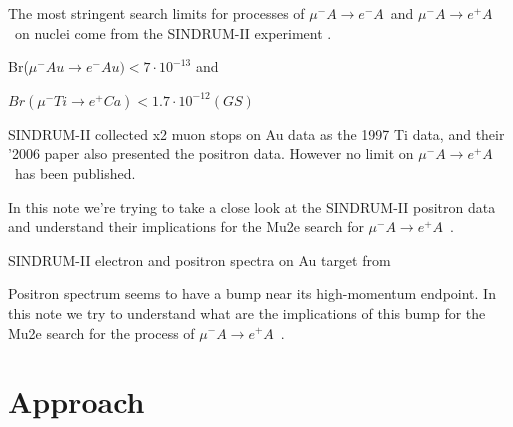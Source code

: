\documentclass[12pt]{article}
\newcommand {\mumemconv} {\mbox{$\mu^- A \rightarrow e^- A$}}
\newcommand {\mumepconv} {\mbox{$\mu^- A \rightarrow e^+ A$}}
\begin{document}
The most stringent search limits for processes of \mumemconv\ and \mumepconv\
on nuclei come from the SINDRUM-II experiment \cite{sindrum_ii_Bertl2006}.

Br($\mu^- Au \rightarrow e^- Au) < 7·10^{-13}$ and

$Br(\mu^- Ti \rightarrow e^+ Ca) < 1.7·10^{-12}(GS)$

SINDRUM-II collected x2 muon stops on Au data as the 1997 Ti data,
and their '2006 paper also presented the positron data.
However no limit on \mumepconv\ has been published.

In this note we're trying to take a close look at the SINDRUM-II positron data
and understand their implications for the Mu2e search for \mumepconv\ .

\vspace{0.2in}
 {
  \label{fig:sindrum_ii_2006_fig_11}
  SINDRUM-II electron and positron spectra on Au target from 
}

Positron spectrum seems to have a bump near its high-momentum endpoint.
In this note we try to understand what are the implications of this bump
for the Mu2e search for the process of \mumepconv\ .

\newpage
\section { Approach}
\end{document}
